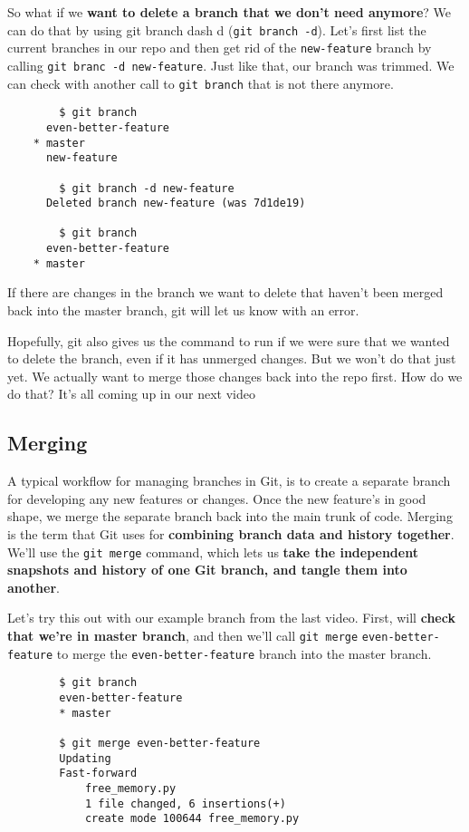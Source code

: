 	So what if we \textbf{want to delete a branch that we don't need anymore}? We can do that by using git branch dash d (\texttt{git branch -d}).
	Let's first list the current branches in our repo and then get rid of the \verb|new-feature| branch by calling \verb|git branc -d new-feature|. Just like that, our branch was trimmed. We can check with another call to \texttt{git branch} that is not there anymore.
	
	\begin{verbatim}
		$ git branch
	  even-better-feature
	* master
	  new-feature
	  
	  	$ git branch -d new-feature
	  Deleted branch new-feature (was 7d1de19)
	  	
	  	$ git branch
      even-better-feature
  	* master
	\end{verbatim}
	
	If there are changes in the branch we want to delete that haven't been merged back into the master branch, git will let us know with an error.
	
	Hopefully, git also gives us the command to run if we were sure that we wanted to delete the branch, even if it has unmerged changes. But we won't do that just yet. We actually want to merge those changes back into the repo first. How do we do that? It's all coming up in our next video
	
	\subsection{Merging}
		
	
	A typical workflow for managing branches in Git, is to create a separate branch for developing any new features or changes. Once the new feature's in good shape, we merge the separate branch back into the main trunk of code. Merging is the term that Git uses for \textbf{combining branch data and history together}. We'll use the \texttt{git merge} command, which lets us \textbf{take the independent snapshots and history of one Git branch, and tangle them into another}.
	
	Let's try this out with our example branch from the last video. First, will \textbf{check that we're in master branch}, and then we'll call \texttt{git merge} \verb|even-better-feature| to merge the \verb|even-better-feature| branch into the master branch. 
	
	\begin{verbatim}
		$ git branch
		even-better-feature
		* master
		
		$ git merge even-better-feature
		Updating
		Fast-forward
			free_memory.py 
			1 file changed, 6 insertions(+)
			create mode 100644 free_memory.py
	\end{verbatim}

